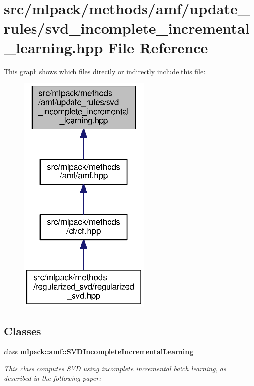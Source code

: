 \section{src/mlpack/methods/amf/update\+\_\+rules/svd\+\_\+incomplete\+\_\+incremental\+\_\+learning.hpp File Reference}
\label{svd__incomplete__incremental__learning_8hpp}
This graph shows which files directly or indirectly include this file\+:
\nopagebreak
\begin{figure}[H]
\begin{center}
\leavevmode
\includegraphics[width=182pt]{svd__incomplete__incremental__learning_8hpp__dep__incl}
\end{center}
\end{figure}
\subsection*{Classes}
\begin{DoxyCompactItemize}
\item 
class {\bf mlpack\+::amf\+::\+S\+V\+D\+Incomplete\+Incremental\+Learning}
\begin{DoxyCompactList}\small\item\em This class computes S\+VD using incomplete incremental batch learning, as described in the following paper\+: \end{DoxyCompactList}\end{DoxyCompactItemize}
